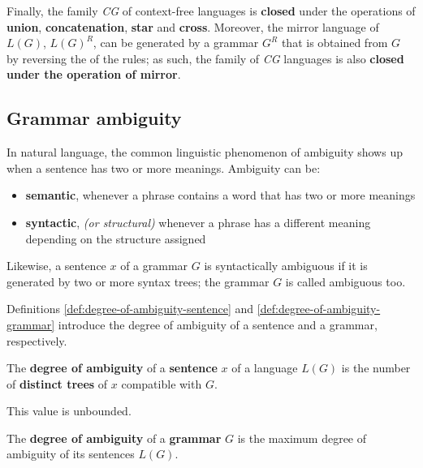 \documentclass[english]{article}
\begin{document}
Finally, the family \textit{CG} of context-free languages is \textbf{closed} under the operations of \textbf{union}, \textbf{concatenation}, \textbf{star} and \textbf{cross}.
Moreover, the mirror language of \(L(G)\), \(L(G)^R\), can be generated by a grammar \(G^R\) that is obtained from \(G\) by reversing the \RP of the rules; as such, the family of \textit{CG} languages is also \textbf{closed under the operation of mirror}.

\subsection{Grammar ambiguity}
\label{sec:grammar-ambiguity}

In natural language, the common linguistic phenomenon of ambiguity shows up when a sentence has two or more meanings.
Ambiguity can be:

\begin{itemize}
  \item \textbf{semantic}, whenever a phrase contains a word that has two or more meanings
  \item \textbf{syntactic}, \textit{(or structural)} whenever a phrase has a different meaning depending on the structure assigned
\end{itemize}

Likewise, a sentence \(x\) of a grammar \(G\) is syntactically ambiguous if it is generated by two or more syntax trees;
the grammar \(G\) is called ambiguous too.

Definitions \ref{def:degree-of-ambiguity-sentence} and \ref{def:degree-of-ambiguity-grammar} introduce the degree of ambiguity of a sentence and a grammar, respectively.

\begin{definition}
  \label{def:degree-of-ambiguity-sentence}
  The \textbf{degree of ambiguity} of a \textbf{sentence} \(x\) of a language \(L(G)\) is the number of \textbf{distinct trees} of \(x\) compatible with \(G\).

  This value is unbounded.
\end{definition}

\begin{definition}
  \label{def:degree-of-ambiguity-grammar}
  The \textbf{degree of ambiguity} of a \textbf{grammar} \(G\) is the maximum degree of ambiguity of its sentences \(L(G)\).
\end{definition}
\end{document}
